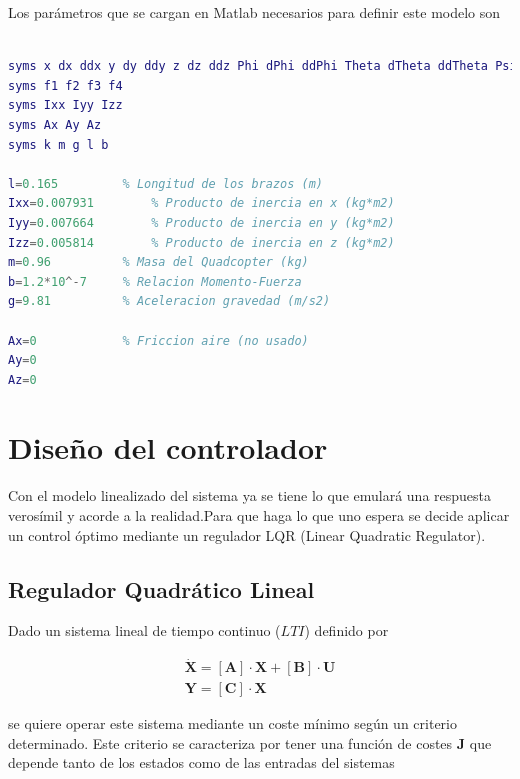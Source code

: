 \documentclass[twoside,11pt]{report}
\begin{document}
Los parámetros que se cargan en Matlab necesarios para definir este modelo son
\begin{lstlisting}[language=Matlab]
% Declaracion simbolica de las variables

syms x dx ddx y dy ddy z dz ddz Phi dPhi ddPhi Theta dTheta ddTheta Psi dPsi ddPsi
syms f1 f2 f3 f4 
syms Ixx Iyy Izz
syms Ax Ay Az 
syms k m g l b

l=0.165			% Longitud de los brazos (m)
Ixx=0.007931		% Producto de inercia en x (kg*m2)
Iyy=0.007664		% Producto de inercia en y (kg*m2)
Izz=0.005814		% Producto de inercia en z (kg*m2)
m=0.96			% Masa del Quadcopter (kg)
b=1.2*10^-7		% Relacion Momento-Fuerza
g=9.81			% Aceleracion gravedad (m/s2)

Ax=0			% Friccion aire (no usado)
Ay=0
Az=0
\end{lstlisting}


\newpage
\chapter{Diseño del controlador} \label{control}

Con el modelo linealizado del sistema ya se tiene lo que emulará una respuesta verosímil y acorde a la realidad.Para que haga lo que uno espera  se decide aplicar un control óptimo mediante un regulador LQR (Linear Quadratic Regulator). \\

\section{Regulador Quadrático Lineal}

Dado un sistema lineal de tiempo continuo ($LTI$) definido por 

\begin{equation}
\begin{array}{l}
\dot{\mathbf{X}}=[\mathbf{A}] \cdot \mathbf{X} + [\mathbf{B}] \cdot \mathbf{U} \\
\mathbf{Y} = [\mathbf{C}] \cdot \mathbf{X} 
\end{array}
\end{equation} 

se quiere operar este sistema mediante un coste mínimo según un criterio determinado. Este criterio se caracteriza por tener una función de costes $\mathbf{J}$ que depende tanto de los estados como de las entradas del sistemas \cite{LQR_Wikipedia}
\end{document}
